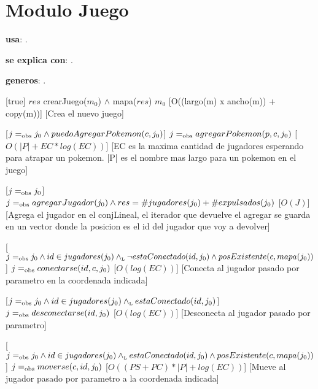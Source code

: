 \section{Modulo Juego}


\begin{Interfaz}

  \textbf{usa}: .

  \textbf{se explica con}: .

  \textbf{generos}: .

  [true]
  {$res$ \igobs crearJuego($m_0$) $\land$ mapa($res$) \igobs $m_0$}
  [O((largo(m) x ancho(m)) + copy(m))]
  [Crea el nuevo juego]

  [$j =_{\mathrm{obs}} j_0 \land puedoAgregarPokemon(c, j_0)$]
  {$j =_{\mathrm{obs}} agregarPokemon(p, c, j_0)$}
  [$O(|P| + EC * log(EC))$]
  [EC es la maxima cantidad de jugadores esperando para atrapar un pokemon. |P| es el nombre mas largo para un pokemon en el juego]

  [$j =_{\mathrm{obs}} j_0$]
  {$j =_{\mathrm{obs}} agregarJugador(j_0) \land res = \#jugadores(j_0) + \#expulsados(j_0)$}
  [$O(J)$]
  [Agrega el jugador en el conjLineal, el iterador que devuelve el agregar se guarda en un vector donde la posicion es el id del jugador que voy a devolver]
  
  [$j =_{\mathrm{obs}} j_0 \land id \in jugadores(j_0) \land_{\mathrm{\scriptscriptstyle{L}}} \neg estaConectado(id, j_0) \land posExistente(c, mapa(j_0))$]
  {$j =_{\mathrm{obs}} conectarse(id, c, j_0)$}
  [$O(log(EC))$]
  [Conecta al jugador pasado por parametro en la coordenada indicada]
  
  [$j =_{\mathrm{obs}} j_0 \land id \in jugadores(j_0) \land_{\mathrm{\scriptscriptstyle{L}}} estaConectado(id, j_0)$]
  {$j =_{\mathrm{obs}} desconectarse(id, j_0)$}
  [$O(log(EC))$]
  [Desconecta al jugador pasado por parametro]
  
  [$j =_{\mathrm{obs}} j_0 \land id \in jugadores(j_0) \land_{\mathrm{\scriptscriptstyle{L}}} estaConectado(id, j_0) \land posExistente(c, mapa(j_0))$]
  {$j =_{\mathrm{obs}} moverse(c, id, j_0)$}
  [$O((PS + PC) * |P| + log(EC))$]
  [Mueve al jugador pasado por parametro a la coordenada indicada]


\end{Interfaz}
